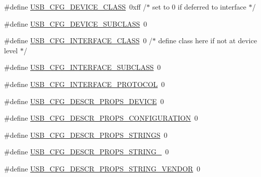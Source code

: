 \begin{DoxyCompactItemize}
\item 
\#define \hyperlink{mhvlib-_vusb-_keyboard_2vusb_2usbconfig-prototype_8h_a9ce4f96ad98b3db8205691e8bc723e55}{U\-S\-B\-\_\-\-C\-F\-G\-\_\-\-D\-E\-V\-I\-C\-E\-\_\-\-C\-L\-A\-S\-S}~0xff    /$\ast$ set to 0 if deferred to interface $\ast$/
\item 
\#define \hyperlink{mhvlib-_vusb-_keyboard_2vusb_2usbconfig-prototype_8h_a89e5ad66f8b835866e7d836c73bfd30d}{U\-S\-B\-\_\-\-C\-F\-G\-\_\-\-D\-E\-V\-I\-C\-E\-\_\-\-S\-U\-B\-C\-L\-A\-S\-S}~0
\item 
\#define \hyperlink{mhvlib-_vusb-_keyboard_2vusb_2usbconfig-prototype_8h_a34f6fe9486b66e8220a82a0eb87a7447}{U\-S\-B\-\_\-\-C\-F\-G\-\_\-\-I\-N\-T\-E\-R\-F\-A\-C\-E\-\_\-\-C\-L\-A\-S\-S}~0   /$\ast$ define class here if not at device level $\ast$/
\item 
\#define \hyperlink{mhvlib-_vusb-_keyboard_2vusb_2usbconfig-prototype_8h_ac643f27afa43062c19b8f0674b6be1b5}{U\-S\-B\-\_\-\-C\-F\-G\-\_\-\-I\-N\-T\-E\-R\-F\-A\-C\-E\-\_\-\-S\-U\-B\-C\-L\-A\-S\-S}~0
\item 
\#define \hyperlink{mhvlib-_vusb-_keyboard_2vusb_2usbconfig-prototype_8h_a8ddab89b764bfd88d024c7d9c9931de3}{U\-S\-B\-\_\-\-C\-F\-G\-\_\-\-I\-N\-T\-E\-R\-F\-A\-C\-E\-\_\-\-P\-R\-O\-T\-O\-C\-O\-L}~0
\item 
\#define \hyperlink{mhvlib-_vusb-_keyboard_2vusb_2usbconfig-prototype_8h_aa916bf33f6f8f481a219d0a81b5b225e}{U\-S\-B\-\_\-\-C\-F\-G\-\_\-\-D\-E\-S\-C\-R\-\_\-\-P\-R\-O\-P\-S\-\_\-\-D\-E\-V\-I\-C\-E}~0
\item 
\#define \hyperlink{mhvlib-_vusb-_keyboard_2vusb_2usbconfig-prototype_8h_a8aae9f682ca9f91faae0453e4351a50b}{U\-S\-B\-\_\-\-C\-F\-G\-\_\-\-D\-E\-S\-C\-R\-\_\-\-P\-R\-O\-P\-S\-\_\-\-C\-O\-N\-F\-I\-G\-U\-R\-A\-T\-I\-O\-N}~0
\item 
\#define \hyperlink{mhvlib-_vusb-_keyboard_2vusb_2usbconfig-prototype_8h_a750fb6cc3e8eafaddae659af97f6f737}{U\-S\-B\-\_\-\-C\-F\-G\-\_\-\-D\-E\-S\-C\-R\-\_\-\-P\-R\-O\-P\-S\-\_\-\-S\-T\-R\-I\-N\-G\-S}~0
\item 
\#define \hyperlink{mhvlib-_vusb-_keyboard_2vusb_2usbconfig-prototype_8h_a9c0556a4c6c5a1ab8f6598aee8e5bf6a}{U\-S\-B\-\_\-\-C\-F\-G\-\_\-\-D\-E\-S\-C\-R\-\_\-\-P\-R\-O\-P\-S\-\_\-\-S\-T\-R\-I\-N\-G\-\_}~0
\item 
\#define \hyperlink{mhvlib-_vusb-_keyboard_2vusb_2usbconfig-prototype_8h_a55edf2117128387162339d98ba2af0f4}{U\-S\-B\-\_\-\-C\-F\-G\-\_\-\-D\-E\-S\-C\-R\-\_\-\-P\-R\-O\-P\-S\-\_\-\-S\-T\-R\-I\-N\-G\-\_\-\-V\-E\-N\-D\-O\-R}~0
\item 

\end{DoxyCompactItemize}
